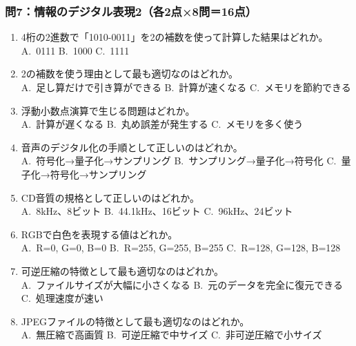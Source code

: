 \documentclass[a4paper,6pt,twoside]{jsarticle}
\begin{document}
\subsubsection*{問7：情報のデジタル表現2（各2点×8問＝16点）}
\begin{enumerate}
\item 4桁の2進数で「1010-0011」を2の補数を使って計算した結果はどれか。\\
A.~0111 \quad B.~1000 \quad C.~1111

\item 2の補数を使う理由として最も適切なのはどれか。\\
A.~足し算だけで引き算ができる \quad B.~計算が速くなる \quad C.~メモリを節約できる

\item 浮動小数点演算で生じる問題はどれか。\\
A.~計算が遅くなる \quad B.~丸め誤差が発生する \quad C.~メモリを多く使う

\item 音声のデジタル化の手順として正しいのはどれか。\\
A.~符号化→量子化→サンプリング \quad B.~サンプリング→量子化→符号化 \quad C.~量子化→符号化→サンプリング

\item CD音質の規格として正しいのはどれか。\\
A.~8kHz、8ビット \quad B.~44.1kHz、16ビット \quad C.~96kHz、24ビット

\item RGBで白色を表現する値はどれか。\\
A.~R=0, G=0, B=0 \quad B.~R=255, G=255, B=255 \quad C.~R=128, G=128, B=128

\item 可逆圧縮の特徴として最も適切なのはどれか。\\
A.~ファイルサイズが大幅に小さくなる \quad B.~元のデータを完全に復元できる \quad C.~処理速度が速い

\item JPEGファイルの特徴として最も適切なのはどれか。\\
A.~無圧縮で高画質 \quad B.~可逆圧縮で中サイズ \quad C.~非可逆圧縮で小サイズ
\end{enumerate}
\end{document}
